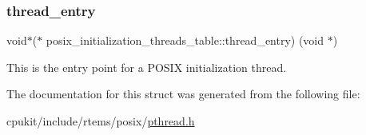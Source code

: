 \subsubsection{\texorpdfstring{thread\_entry}{thread\_entry}}
{\footnotesize\ttfamily void$\ast$($\ast$ posix\+\_\+initialization\+\_\+threads\+\_\+table\+::thread\+\_\+entry) (void $\ast$)}

This is the entry point for a P\+O\+S\+IX initialization thread. 

The documentation for this struct was generated from the following file\+:\begin{DoxyCompactItemize}
\item 
cpukit/include/rtems/posix/\mbox{\hyperlink{pthread_8h}{pthread.\+h}}\end{DoxyCompactItemize}
